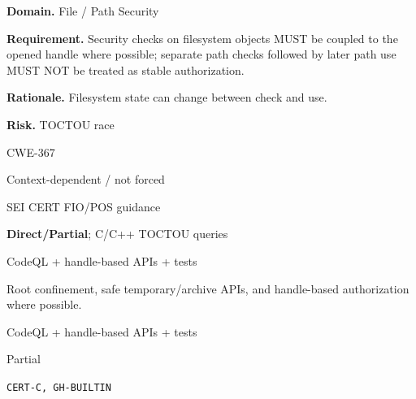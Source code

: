 \documentclass[10pt,letterpaper]{article}
\newcommand{\prioritybadge}[2]{\tcbox[on line,boxrule=0pt,arc=1.2mm,boxsep=0.7mm,left=1mm,right=1mm,top=0.4mm,bottom=0.4mm,colback=#2!12,coltext=#2]{\scriptsize\bfseries #1}}
\begin{document}
\begin{rulebox}[title={\texttt{SCS-C-FILE-001} \hfill \prioritybadge{High Priority}{High}}]
\textbf{Domain.} File / Path Security

\textbf{Requirement.} Security checks on filesystem objects MUST be coupled to the opened handle where possible; separate path checks followed by later path use MUST NOT be treated as stable authorization.

\textbf{Rationale.} Filesystem state can change between check and use.

\textbf{Risk.} TOCTOU race

\begin{description}[leftmargin=2.65cm,labelwidth=2.3cm,style=nextline,itemsep=1pt,topsep=3pt]
  \item[CWE] CWE-367
  \item[OWASP] Context-dependent / not forced
  \item[CERT] SEI CERT FIO/POS guidance
  \item[CodeQL] \textbf{Direct/Partial}; C/C++ TOCTOU queries
  \item[Enforcement] CodeQL + handle-based APIs + tests
  \item[Prevention] Root confinement, safe temporary/archive APIs, and handle-based authorization where possible.
  \item[Verification] CodeQL + handle-based APIs + tests
  \item[Automation] Partial
  \item[Sources] \texttt{CERT-C, GH-BUILTIN}
\end{description}
\end{rulebox}
\end{document}
